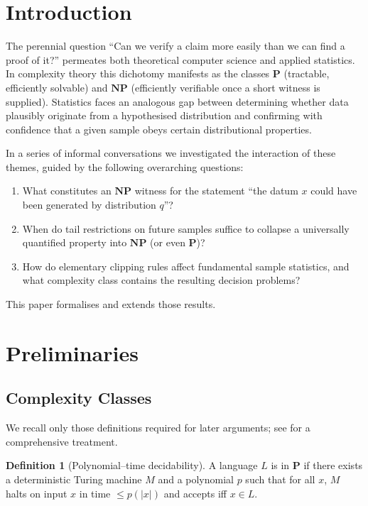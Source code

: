 \documentclass[12pt]{article}
\theoremstyle{definition}
\newtheorem{definition}{Definition}[section]
\begin{document}
\tableofcontents

\section{Introduction}
The perennial question ``Can we verify a claim more easily than we can find a proof of it?'' permeates both theoretical computer science and applied statistics.  In complexity theory this dichotomy manifests as the classes $\mathbf{P}$ (tractable, efficiently solvable) and $\mathbf{NP}$ (efficiently verifiable once a short witness is supplied).  Statistics faces an analogous gap between determining whether data plausibly originate from a hypothesised distribution and confirming with confidence that a given sample obeys certain distributional properties.  

In a series of informal conversations we investigated the interaction of these themes, guided by the following overarching questions:
\begin{enumerate}
  \item What constitutes an $\mathbf{NP}$ witness for the statement ``the datum $x$ could have been generated by distribution $q$''?
  \item When do tail restrictions on future samples suffice to collapse a universally quantified property into $\mathbf{NP}$ (or even $\mathbf{P}$)?
  \item How do elementary clipping rules affect fundamental sample statistics, and what complexity class contains the resulting decision problems?
\end{enumerate}

This paper formalises and extends those results.

\section{Preliminaries}
\subsection{Complexity Classes}
We recall only those definitions required for later arguments; see \cite{sipser2012introduction} for a comprehensive treatment.

\begin{definition}[Polynomial--time decidability]
A language $L$ is in $\mathbf{P}$ if there exists a deterministic Turing machine $M$ and a polynomial $p$ such that for all $x$, $M$ halts on input $x$ in time $\le p(|x|)$ and accepts iff $x \in L$.
\end{definition}
\end{document}
